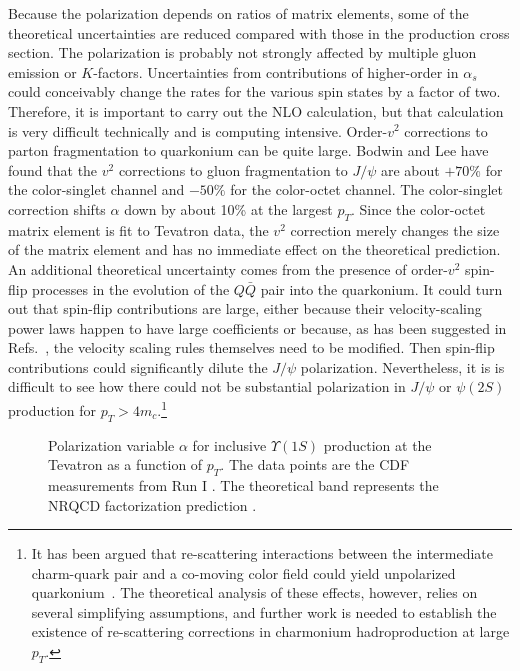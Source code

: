 Because the polarization depends on ratios of matrix elements, some of
the theoretical uncertainties are reduced compared with those in the
production cross section. The polarization is probably not strongly
affected by multiple gluon emission or $K$-factors. Uncertainties
from contributions of higher-order in $\alpha_s$ could conceivably
change the rates for the various spin states by a factor of two. 
Therefore, it is important to carry out the NLO calculation, but that
calculation is very difficult technically and is computing intensive. 
Order-$v^2$ corrections to parton fragmentation to quarkonium can be
quite large. Bodwin and Lee \cite{Bodwin:2003wh} have found that the $v^2$
corrections to gluon fragmentation to $J/\psi$ are about $+70\%$ for
the color-singlet channel and $-50\%$ for the color-octet channel.
The color-singlet correction shifts $\alpha$ down by about 10\% at the
largest $p_T$. Since the color-octet matrix element is fit to Tevatron
data, the $v^2$ correction merely changes the size of the matrix element
and has no immediate effect on the theoretical prediction. An additional
theoretical uncertainty comes from the presence of order-$v^2$ spin-flip
processes in the evolution of the $Q\bar Q$ pair into the quarkonium.
It could turn out that spin-flip contributions are large, either
because their velocity-scaling power laws happen to have large
coefficients or because, as has been suggested in
Refs.~\cite{Beneke:1997av,Brambilla:1999xf,Fleming:2000ib,
Sanchis-Lozano:2001rr,Brambilla:2002nu}, the
velocity scaling rules themselves need to be modified. Then spin-flip
contributions could significantly dilute the $J/\psi$ polarization.
Nevertheless, it is is difficult to see how there could not be
substantial polarization in $J/\psi$ or $\psi(2S)$ production for
$p_T>4m_c$.\footnote{It has been argued that re-scattering interactions
between the intermediate charm-quark pair and a co-moving color field
could yield unpolarized quarkonium~\cite{Marchal:2000wd,Maul:2001fw}.
The theoretical analysis of these effects, however, relies on several
simplifying assumptions, and further work is needed to establish the
existence of re-scattering corrections in charmonium hadroproduction at
large $p_T$.}

\begin{figure}[htb]
\begin{center}
\caption{ Polarization variable $\alpha$ for inclusive $\Upsilon(1S)$
production at the Tevatron as a function of $p_T$. The data points
are the CDF measurements from Run I \cite{Acosta:2001gv}.
The theoretical band represents 
the NRQCD factorization prediction \cite{Braaten:2000gw}.}
\label{fig-upsilon-pol}
\end{center}
\end{figure}

